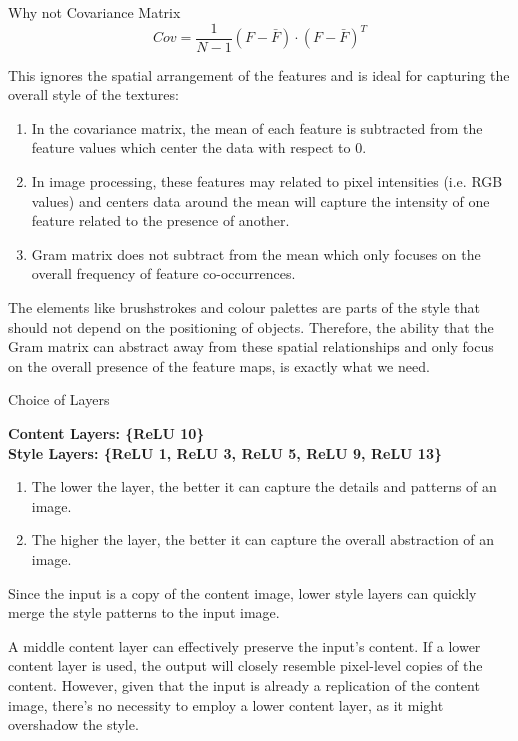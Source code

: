 \documentclass[final]{beamer}
\newlength{\colwidth}
\begin{document}
\begin{frame}[t]
\begin{columns}[t]
\begin{column}{\colwidth}
\begin{alertblock}{Why not Covariance Matrix}
    $$Cov = \frac{1}{N-1} (F-\bar{F})\cdot(F-\bar{F})^T$$

    This ignores the spatial arrangement of the features and is ideal for capturing the overall style of the textures:

    \begin{enumerate}
        \item In the covariance matrix, the mean of each feature is subtracted from the feature values which center the data with respect to 0.
        \item In image processing, these features may related to pixel intensities (i.e. RGB values) and centers data around the mean will capture the intensity of one feature related to the presence of another.
        \item Gram matrix does not subtract from the mean which only focuses on the overall frequency of feature co-occurrences.
    \end{enumerate}

    The elements like brushstrokes and colour palettes are parts of the style that should not depend on the positioning of objects. Therefore, the ability that the Gram matrix can abstract away from these spatial relationships and only focus on the overall presence of the feature maps, is exactly what we need.

  \end{alertblock}

  \begin{exampleblock}{Choice of Layers}

    \textbf{Content Layers: \{ReLU 10\}}\\
    
    \textbf{Style Layers: \{ReLU 1, ReLU 3, ReLU 5, ReLU 9, ReLU 13\}}

    \begin{enumerate}
        \item The lower the layer, the better it can capture the details and patterns of an image.
        \item The higher the layer, the better it can capture the overall abstraction of an image.
    \end{enumerate}

    Since the input is a copy of the content image, lower style layers can quickly merge the style patterns to the input image.

    A middle content layer can effectively preserve the input's content. If a lower content layer is used, the output will closely resemble pixel-level copies of the content. However, given that the input is already a replication of the content image, there's no necessity to employ a lower content layer, as it might overshadow the style.


\end{exampleblock}
\end{column}
\end{columns}
\end{frame}
\end{document}
